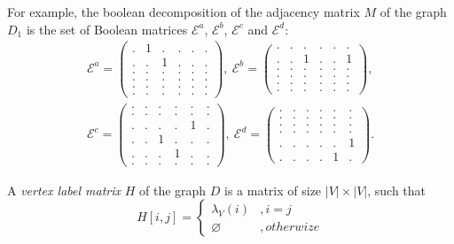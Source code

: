 For example, the boolean decomposition of the adjacency matrix $M$ of the graph $D_1$ is the set of Boolean matrices $\mathcal{E}^a$, $\mathcal{E}^b$, $\mathcal{E}^c$ and $\mathcal{E}^d$:
{
    \renewcommand{\arraystretch}{0.5}
    \setlength\arraycolsep{1.5pt}
\begin{align*}
\mathcal{E}^a =
\begin{pmatrix}
    . & 1 & . & . & . & . \\
    . & . & 1 & . & . & . \\
    . & . & . & . & . & . \\
    . & . & . & . & . & . \\
    . & . & . & . & . & . \\
    . & . & . & . & . & .
\end{pmatrix},~
\mathcal{E}^b =
\begin{pmatrix}
    . & . & . & . & . & . \\
    . & . & 1 & . & . & 1 \\
    . & . & . & . & . & . \\
    . & . & . & . & . & . \\
    . & . & . & . & . & . \\
    . & . & . & . & . & .
\end{pmatrix},\\
\mathcal{E}^c =
\begin{pmatrix}
    . & . & . & . & . & . \\
    . & . & . & . & . & . \\
    . & . & . & . & 1 & . \\
    . & . & 1 & . & . & . \\
    . & . & . & 1 & . & . \\
    . & . & . & . & . & .
\end{pmatrix},~
\mathcal{E}^d =
\begin{pmatrix}
    . & . & . & . & . & . \\
    . & . & . & . & . & . \\
    . & . & . & . & . & . \\
    . & . & . & . & . & . \\
    . & . & . & . & . & 1 \\
    . & . & . & . & 1 & .
\end{pmatrix}.
\end{align*}
}

\begin{definition}

A \emph{vertex label matrix} $H$ of the graph $D$ is a matrix of size $|V|\times|V|$, such that
\begin{equation*}
H[i,j] =
  \begin{cases}
    \lambda_V (i) &, i = j \\
    \varnothing   &, otherwize
  \end{cases}
\end{equation*}
\end{definition}

